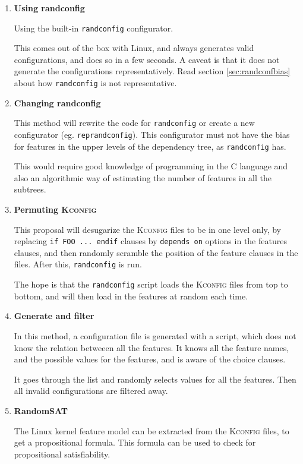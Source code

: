 \documentclass[a4paper,11pt]{report}
\newcommand{\textcode}[1]{\fboxsep=1pt\texttt{\colorbox{gray!20}{#1}}}
\begin{document}
\begin{enumerate}

    \item \textbf{Using randconfig}

Using the built-in \texttt{randconfig} configurator.

This comes out of the box with Linux, and always generates valid configurations,
and does so in a few seconds. A caveat is that it does not generate the 
configurations representatively. Read section \ref{sec:randconfbias} about how 
\texttt{randconfig} is not representative.


    \item \textbf{Changing randconfig}

This method will rewrite the code for \texttt{randconfig} or create a new 
configurator (eg. \texttt{reprandconfig}).  This configurator must not have the 
bias for features in the upper levels of the dependency tree, as 
\texttt{randconfig} has.

This would require good knowledge of programming in the \textsc{C} language
and also an algorithmic way of estimating the number of features in all the 
subtrees.


    \item \textbf{Permuting \textsc{Kconfig}}


This proposal will desugarize the \textsc{Kconfig} files to be in one level 
only, by replacing \textcode{if FOO ... endif} clauses by \textcode{depends on} 
options in the features clauses, and then randomly scramble the position of 
the feature clauses in the files. After this, \texttt{randconfig} is run.

The hope is that the \texttt{randconfig} script loads the \textsc{Kconfig} 
files from top to bottom, and will then load in the features at random each 
time.


    \item \textbf{Generate and filter}

            \def \fn {It also is aware about \texttt{choice} clauses}

In this method, a configuration file is generated with a script, which 
does not know the relation betweeen all the features. It knows all the feature
names, and the possible values for the features, and is aware of the choice 
clauses.

It goes through the list and randomly selects values for all the features. Then 
all invalid configurations are filtered away.


    \item \textbf{RandomSAT}

The Linux kernel feature model can be extracted from the \textsc{Kconfig} 
files, to get a propositional formula\cite{lvat}. This formula can be used to 
check for propositional satisfiability.


    
\end{enumerate}
\end{document}
